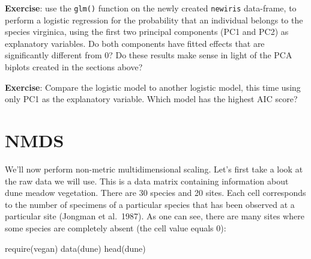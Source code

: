\documentclass[
]{book}
\newenvironment{Shaded}{\begin{snugshade}}{\end{snugshade}}
\newcommand{\FunctionTok}[1]{\textcolor[rgb]{0.00,0.00,0.00}{#1}}
\newcommand{\NormalTok}[1]{#1}
\begin{document}
\textbf{Exercise}: use the \texttt{glm()} function on the newly created \texttt{newiris} data-frame, to perform a logistic regression for the probability that an individual belongs to the species virginica, using the first two principal components (PC1 and PC2) as explanatory variables. Do both components have fitted effects that are significantly different from 0? Do these results make sense in light of the PCA biplots created in the sections above?

\textbf{Exercise}: Compare the logistic model to another logistic model, this time using only PC1 as the explanatory variable. Which model has the highest AIC score?

\hypertarget{nmds}{%
\section{NMDS}\label{nmds}}

We'll now perform non-metric multidimensional scaling. Let's first take a look at the raw data we will use. This is a data matrix containing information about dune meadow vegetation. There are 30 species and 20 sites. Each cell corresponds to the number of specimens of a particular species that has been observed at a particular site (Jongman et al.~1987). As one can see, there are many sites where some species are completely absent (the cell value equals 0):

\begin{Shaded}
\begin{Highlighting}[]
\FunctionTok{require}\NormalTok{(vegan)}
\FunctionTok{data}\NormalTok{(dune)}
\FunctionTok{head}\NormalTok{(dune)}
\end{Highlighting}
\end{Shaded}
\end{document}
